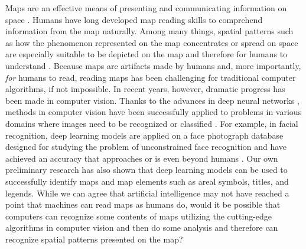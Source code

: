 

Maps are an effective means of presenting and communicating information on space \citep{crampton2001maps}. Humans have long developed map reading skills \citep{presson1982development,gilhooly1988skill} to comprehend information from the map naturally. Among many things, spatial patterns such as how the phenomenon represented on the map concentrates or spread on space are especially suitable to be depicted on the map and therefore for humans to understand \citep{slocum2009thematic,kimerling2016map}. Because maps are artifacts made by humans and, more importantly, {\it for} humans to read, reading maps has been challenging for traditional computer algorithms, if not impossible. In recent years, however, dramatic progress has been made in computer vision. Thanks to the advances in deep neural networks \citep{goodfellow2016deep}, methods in computer vision have been successfully applied to problems in various domains where images need to be recognized or classified \citep{Szeliski2021}. For example, in facial recognition, deep learning models are applied on a face photograph database designed for studying the problem of unconstrained face recognition and have achieved an accuracy that approaches or is even beyond humans \citep{Wang2021}. Our own preliminary research \citep{li2019geocomp} has also shown that deep learning models can be used to successfully identify maps and map elements such as areal symbols, titles, and legends. While we can agree that artificial intelligence may not have reached a point that machines can read maps as humans do, would it be possible that computers can recognize some contents of maps utilizing the cutting-edge algorithms in computer vision and then do some analysis and therefore can recognize spatial patterns presented on the map?

